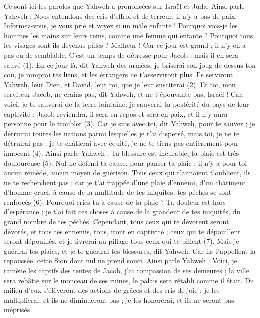 \begin{multicols}{2}
Ce sont ici les paroles que Yahweh a prononcées sur Israël et Juda.
Ainsi parle Yahweh : Nous entendons des cris d’effroi et de terreur, il n'y a pas de paix.
Informez-vous, je vous prie et voyez si un mâle enfante ! Pourquoi vois-je les hommes les mains sur leurs reins, comme une femme qui enfante ? Pourquoi tous les visages sont-ils devenus pâles ?
Malheur ! Car ce jour est grand ; il n'y en a pas eu de semblable. C'est un temps de détresse pour Jacob ; mais il en sera sauvé\FTNT{} (1).
En ce jour-là, dit Yahweh des armées, je briserai son joug de dessus ton cou, je romprai tes liens, et les étrangers ne t'asserviront plus.
Ils serviront Yahweh, leur Dieu, et David, leur roi, que je leur susciterai\FTNT{} (2).
Et toi, mon serviteur Jacob, ne crains pas, dit Yahweh, et ne t'épouvante pas, Israël ! Car, voici, je te sauverai de la terre lointaine, je sauverai ta postérité du pays de leur captivité ; Jacob reviendra, il sera en repos et sera en paix, et il n'y aura personne pour le troubler\FTNT{} (3).
Car je suis avec toi, dit Yahweh, pour te sauver ; je détruirai toutes les nations parmi lesquelles je t'ai dispersé, mais toi, je ne te détruirai pas ; je te châtierai avec équité, je ne te tiens pas entièrement pour innocent\FTNT{} (4).
Ainsi parle Yahweh : Ta blessure est incurable, ta plaie est très douloureuse\FTNT{} (5).
Nul ne défend ta cause, pour panser ta plaie ; il n'y a  pour toi aucun remède, aucun moyen de guérison.
Tous ceux qui t'aimaient t'oublient, ils ne te recherchent pas ; car je t'ai frappée d'une plaie d'ennemi, d'un châtiment d’homme cruel, à cause de la multitude de tes iniquités, tes péchés se sont renforcés\FTNT{} (6).
Pourquoi cries-tu à cause de ta plaie ? Ta douleur est hors d’espérance ; je t’ai fait ces choses à cause de la grandeur de tes iniquités, du grand nombre de tes péchés.
Cependant, tous ceux qui te dévorent seront dévorés, et tous tes ennemis, tous, iront en captivité ; ceux qui te dépouillent seront dépouillés, et je livrerai au pillage tous ceux qui te pillent\FTNT{} (7).
Mais je guérirai tes plaies, et je te guérirai tes blessures, dit Yahweh. Car ils t’appellent la repoussée, cette Sion dont nul ne prend souci.
Ainsi parle Yahweh : Voici, je ramène les captifs des tentes de Jacob, j'ai compassion de ses demeures ; la ville sera rebâtie sur le monceau de ses ruines, le palais sera rétabli comme il était.
Du milieu d’eux s’élèveront des actions de grâces et des cris de joie ;  je les multiplierai, et ils ne diminueront pas ; je les honorerai, et ils ne seront pas méprisés.

\end{multicols}
